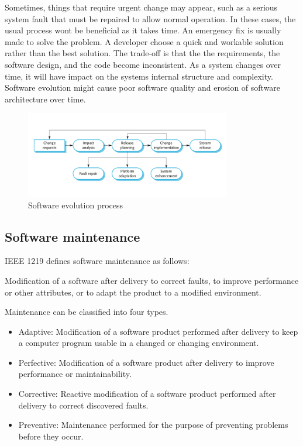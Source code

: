 Sometimes, things that require urgent change may appear, such as a serious system fault that must be repaired to allow normal operation. In these cases, the usual process wont be beneficial as it takes time. An emergency fix is usually made to solve the problem. A developer choose a quick and workable solution rather than the best solution. The trade-off is that the the requirements, the software design, and the code become inconsistent. As a system changes over time, it will have impact on the systems internal structure and complexity. Software evolution might cause poor software quality and erosion of software architecture over time\cite{Bass:2012:SAP:2392670}.

\begin{figure}[h!]
	\centering
	\includegraphics[width=0.8\textwidth]{images/SEprocess.png}
	\caption{Software evolution process}
	\label{fig:seProcess}
\end{figure}


\subsection{Software maintenance}
IEEE 1219 defines software maintenance as follows\cite{720567}:
\begin{displayquote}
Modification of a software after delivery to correct faults, to improve performance or other attributes, or to adapt the product to a modified environment.
\end{displayquote} 
Maintenance can be classified into four types\cite{Bennett:2000:SME:336512.336534,720567}.

\begin{itemize}
	\item Adaptive: Modification of a software product performed after delivery to keep a computer program usable in a changed or changing environment.
	\item Perfective: Modification of a software product after delivery to improve performance or maintainability.
	\item Corrective: Reactive modification of a software product performed after delivery to correct discovered faults.
	\item Preventive: Maintenance performed for the purpose of preventing problems before they occur.
\end{itemize}

